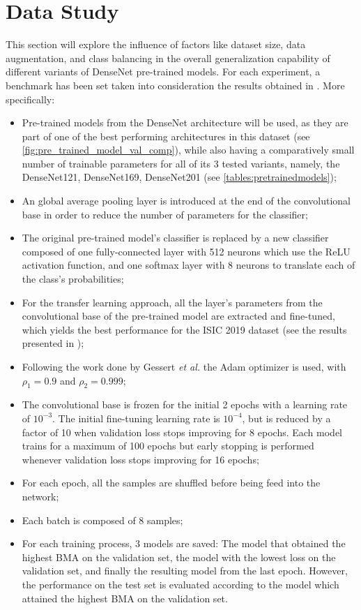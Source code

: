 \section{Data Study} \label{section:balance}
    This section will explore the influence of factors like dataset size, data augmentation, and class balancing in the overall generalization capability of different variants of DenseNet pre-trained models. For each experiment, a benchmark has been set taken into consideration the results obtained in . More specifically:
    \begin{itemize}
        \item Pre-trained models from the DenseNet architecture will be used, as they are part of one of the best performing architectures in this dataset (see \autoref{fig:pre_trained_model_val_comp}), while also having a comparatively small number of trainable parameters for all of its 3 tested variants, namely, the DenseNet121, DenseNet169, DenseNet201 (see \autoref{tables:pretrainedmodels});
        \item An global average pooling layer is introduced at the end of the convolutional base in order to reduce the number of parameters for the classifier;
        \item The original pre-trained model's classifier is replaced by a new classifier composed of one fully-connected layer with 512 neurons which use the ReLU activation function, and one softmax layer with 8 neurons to translate each of the class's probabilities;
        \item For the transfer learning approach, all the layer's parameters from the convolutional base of the pre-trained model are extracted and fine-tuned, which yields the best performance for the \ac{ISIC} 2019 dataset (see the results presented in );
        \item Following the work done by Gessert \textit{et al.} \cite{gessert2018} the Adam optimizer \cite{adam} is used, with $\rho_{1} = 0.9$ and $\rho_{2}=0.999$;
        \item The convolutional base is frozen for the initial 2 epochs with a learning rate of $10^{-3}$. The initial fine-tuning learning rate is $10^{-4}$, but is reduced by a factor of 10 when validation loss stops improving for 8 epochs. Each model trains for a maximum of 100 epochs but early stopping is performed whenever validation loss stops improving for 16 epochs;
        \item For each epoch, all the samples are shuffled before being feed into the network;
        \item Each batch is composed of 8 samples;
        \item For each training process, 3 models are saved: The model that obtained the highest \ac{BMA} on the validation set, the model with the lowest loss on the validation set, and finally the resulting model from the last epoch. However, the performance on the test set is evaluated according to the model which attained the highest \ac{BMA} on the validation set. 
    \end{itemize}
    
